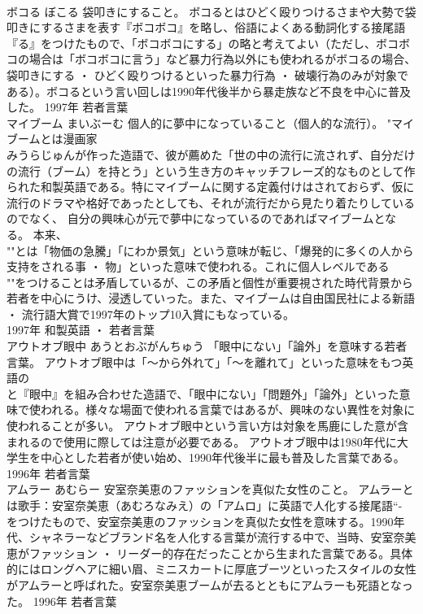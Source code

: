 \documentclass[8pt]{extreport}
\begin{document}
\begin{CJK}{UTF8}{min}
\\	ボコる	ぼこる	袋叩きにすること。	ボコるとはひどく殴りつけるさまや大勢で袋叩きにするさまを表す『ボコボコ』を略し、俗語によくある動詞化する接尾語『る』をつけたもので、「ボコボコにする」の略と考えてよい（ただし、ボコボコの場合は「ボコボコに言う」など暴力行為以外にも使われるがボコるの場合、袋叩きにする ・ ひどく殴りつけるといった暴力行為 ・ 破壊行為のみが対象である）。ボコるという言い回しは1990年代後半から暴走族など不良を中心に普及した。	1997年	若者言葉	
\\	マイブーム	まいぶーむ	個人的に夢中になっていること（個人的な流行）。	"マイブームとは漫画家
\\	みうらじゅんが作った造語で、彼が薦めた「世の中の流行に流されず、自分だけの流行（ブーム）を持とう」という生き方のキャッチフレーズ的なものとして作られた和製英語である。特にマイブームに関する定義付けはされておらず、仮に流行のドラマや格好であったとしても、それが流行だから見たり着たりしているのでなく、 自分の興味心が元で夢中になっているのであればマイブームとなる。 本来、
\\	""とは「物価の急騰」「にわか景気」という意味が転じ、「爆発的に多くの人から支持をされる事 ・ 物」といった意味で使われる。これに個人レベルである
\\	""をつけることは矛盾しているが、この矛盾と個性が重要視された時代背景から若者を中心にうけ、浸透していった。また、マイブームは自由国民社による新語 ・ 流行語大賞で1997年のトップ10入賞にもなっている。
\\	1997年	和製英語 ・ 若者言葉	
\\	アウトオブ眼中	あうとおぶがんちゅう	「眼中にない」「論外」を意味する若者言葉。	アウトオブ眼中は「～から外れて」「～を離れて」といった意味をもつ英語の
\\	と『眼中』を組み合わせた造語で、「眼中にない」「問題外」「論外」といった意味で使われる。様々な場面で使われる言葉ではあるが、興味のない異性を対象に使われることが多い。 アウトオブ眼中という言い方は対象を馬鹿にした意が含まれるので使用に際しては注意が必要である。 アウトオブ眼中は1980年代に大学生を中心とした若者が使い始め、1990年代後半に最も普及した言葉である。	1996年	若者言葉	
\\	アムラー	あむらー	安室奈美恵のファッションを真似た女性のこと。	アムラーとは歌手：安室奈美恵（あむろなみえ）の「アムロ」に英語で人化する接尾語“-
\\	をつけたもので、安室奈美恵のファッションを真似た女性を意味する。1990年代、シャネラーなどブランド名を人化する言葉が流行する中で、当時、安室奈美恵がファッション ・ リーダー的存在だったことから生まれた言葉である。具体的にはロングヘアに細い眉、ミニスカートに厚底ブーツといったスタイルの女性がアムラーと呼ばれた。安室奈美恵ブームが去るとともにアムラーも死語となった。	1996年	若者言葉	

\end{CJK}
\end{document}

